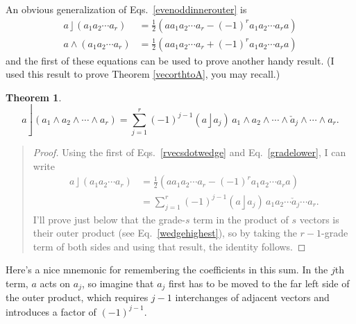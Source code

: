 \documentclass{utarticle}
\DeclareMathOperator{\lin}{\rfloor}
\DeclareMathOperator{\out}{\wedge}
\newcommand{\half}{\ensuremath{\frac{1}{2}}}
\newtheorem{thm}{Theorem}
\newcommand{\bp}{\begin{quotation} \begin{proof}}
\newcommand{\ep}{\end{proof} \end{quotation}}
\begin{document}
An obvious generalization of Eqs.~\eqref{evenoddinnerouter} is
\begin{align}
a \lin (a_1 a_2 \dotsb a_r) & = \half(a a_1 a_2 \dotsb a_r - 
                                 (-1)^r a_1 a_2 \dotsb a_r a) \nonumber \\
a \out (a_1 a_2 \dotsb a_r) & = \half(a a_1 a_2 \dotsb a_r + 
                                 (-1)^r a_1 a_2 \dotsb a_r a)
\label{rvecsdotwedge}
\end{align}
and the first of these equations can be used to prove another handy result.
(I used this result to prove Theorem \ref{vecorthtoA}, you may recall.)
\begin{thm}
\begin{equation}
a \lin (a_1 \out a_2 \out \dotsb \out a_r) = \sum_{j=1}^r (-1)^{j-1} 
    (a \lin a_j) \, a_1 \out a_2 \out \dotsb \out \check{a}_j \out 
    \dotsb \out a_r.
\label{veclinoutid}
\end{equation}
\label{alinoutai}
\end{thm}
\bp
Using the first of Eqs.~\eqref{rvecsdotwedge} and Eq.~\eqref{gradelower}, I can write
\begin{align} 
a \lin (a_1 a_2 \dotsb a_r) & = \half(a a_1 a_2 \dotsb a_r - (-1)^r a_1 a_2 
                                  \dotsb a_r a) \nonumber \\
 & = \sum_{j=1}^r (-1)^{j-1} (a \lin a_j) \, a_1 a_2 \dotsb 
                  \check{a}_j \dotsb a_r.
\label{ainnerprod}
\end{align}
I'll prove just below that the grade-$s$ term in the product of $s$ vectors 
is their outer product (see Eq.~\eqref{wedgehighest}), so by taking the 
$r-1$-grade term of both sides and using that result, the identity follows. 
\ep
Here's a nice mnemonic for remembering the coefficients in this sum.  In the 
$j$th term, $a$ acts on $a_j$, so imagine that $a_j$ first has to be moved 
to the far left side of the outer product, which requires $j-1$ interchanges of adjacent
vectors and introduces a factor of $(-1)^{j-1}$.
\end{document}
